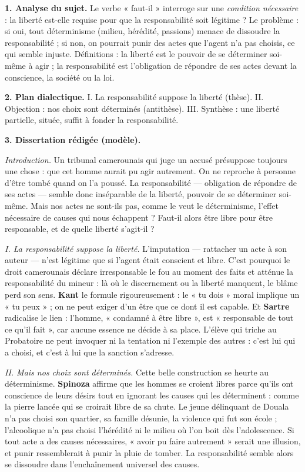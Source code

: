 \documentclass[11pt]{article}
\newcommand{\cle}[1]{{\popxbold\color{popdark}#1}}
\begin{document}
\begin{corrige}
\textbf{1. Analyse du sujet.} Le verbe « faut-il » interroge sur une \emph{condition nécessaire} : la liberté est-elle requise pour que la responsabilité soit légitime ? Le problème : si oui, tout déterminisme (milieu, hérédité, passions) menace de dissoudre la responsabilité ; si non, on pourrait punir des actes que l'agent n'a pas choisis, ce qui semble injuste. Définitions : la \cle{liberté} est le pouvoir de se déterminer soi-même à agir ; la \cle{responsabilité} est l'obligation de répondre de ses actes devant la conscience, la société ou la loi.

\textbf{2. Plan dialectique.} I. La responsabilité suppose la liberté (thèse). II. Objection : nos choix sont déterminés (antithèse). III. Synthèse : une liberté partielle, située, suffit à fonder la responsabilité.

\textbf{3. Dissertation rédigée (modèle).}

\emph{Introduction.} Un tribunal camerounais qui juge un accusé présuppose toujours une chose : que cet homme aurait pu agir autrement. On ne reproche à personne d'être tombé quand on l'a poussé. La responsabilité — obligation de répondre de ses actes — semble donc inséparable de la liberté, pouvoir de se déterminer soi-même. Mais nos actes ne sont-ils pas, comme le veut le déterminisme, l'effet nécessaire de causes qui nous échappent ? Faut-il alors être libre pour être responsable, et de quelle liberté s'agit-il ?

\emph{I. La responsabilité suppose la liberté.} L'imputation — rattacher un acte à son auteur — n'est légitime que si l'agent était conscient et libre. C'est pourquoi le droit camerounais déclare irresponsable le fou au moment des faits et atténue la responsabilité du mineur : là où le discernement ou la liberté manquent, le blâme perd son sens. \textbf{Kant} le formule rigoureusement : le « tu dois » moral implique un « tu peux » ; on ne peut exiger d'un être que ce dont il est capable. Et \textbf{Sartre} radicalise le lien : l'homme, « condamné à être libre », est « responsable de tout ce qu'il fait », car aucune essence ne décide à sa place. L'élève qui triche au Probatoire ne peut invoquer ni la tentation ni l'exemple des autres : c'est lui qui a choisi, et c'est à lui que la sanction s'adresse.

\emph{II. Mais nos choix sont déterminés.} Cette belle construction se heurte au déterminisme. \textbf{Spinoza} affirme que les hommes se croient libres parce qu'ils ont conscience de leurs désirs tout en ignorant les causes qui les déterminent : comme la pierre lancée qui se croirait libre de sa chute. Le jeune délinquant de Douala n'a pas choisi son quartier, sa famille désunie, la violence qui fut son école ; l'alcoolique n'a pas choisi l'hérédité ni le milieu où l'on boit dès l'adolescence. Si tout acte a des causes nécessaires, « avoir pu faire autrement » serait une illusion, et punir ressemblerait à punir la pluie de tomber. La responsabilité semble alors se dissoudre dans l'enchaînement universel des causes.


\end{corrige}
\end{document}
